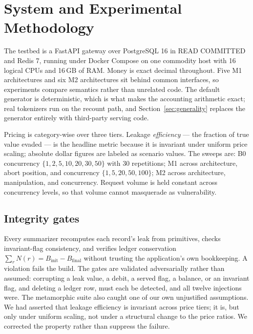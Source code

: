 \documentclass[preprint,3p,authoryear,12pt]{elsarticle}
\begin{document}
\section{System and Experimental Methodology}
\label{sec:method}
The testbed is a FastAPI gateway over PostgreSQL 16 in READ COMMITTED and Redis 7,
running under Docker Compose on one commodity host with 16 logical CPUs and 16\,GB of
RAM. Money is exact decimal throughout. Five M1 architectures and six M2 architectures
sit behind common interfaces, so experiments compare semantics rather than unrelated
code. The default generator is deterministic, which is what makes the accounting
arithmetic exact; real tokenizers run on the recount path, and
Section~\ref{sec:generality} replaces the generator entirely with third-party serving
code.

Pricing is category-wise over three tiers. Leakage \emph{efficiency} --- the fraction of
true value evaded --- is the headline metric because it is invariant under uniform price
scaling; absolute dollar figures are labeled as scenario values. The sweeps are: B0
concurrency $\{1,2,5,10,20,30,50\}$ with 30 repetitions; M1 across architecture, abort
position, and concurrency $\{1,5,20,50,100\}$; M2 across architecture, manipulation, and
concurrency. Request volume is held constant across concurrency levels, so that volume
cannot masquerade as vulnerability.

\subsection{Integrity gates}
Every summarizer recomputes each record's leak from primitives, checks invariant-flag
consistency, and verifies ledger conservation $\sum_r N(r) = B_{\mathrm{init}} -
B_{\mathrm{final}}$ without trusting the application's own bookkeeping. A violation fails
the build. The gates are validated adversarially rather than assumed: corrupting a leak
value, a debit, a served flag, a balance, or an invariant flag, and deleting a ledger row,
must each be detected, and all twelve injections were. The metamorphic suite also caught
one of our own unjustified assumptions. We had asserted that leakage efficiency is
invariant across price tiers; it is, but only under uniform scaling, not under a
structural change to the price ratios. We corrected the property rather than suppress the
failure.
\end{document}
